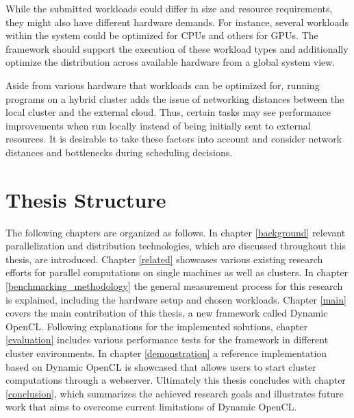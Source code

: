 \begin{description}[style=nextline]
    \item [Workload Diversity]
    While the submitted workloads could differ in size and resource requirements, they might also have different hardware demands. For instance, several workloads within the system could be optimized for CPUs and others for GPUs. The framework should support the execution of these workload types and additionally optimize the distribution across available hardware from a global system view.

    \item [Optimized Scheduling]
    Aside from various hardware that workloads can be optimized for, running programs on a hybrid cluster adds the issue of networking distances between the local cluster and the external cloud. Thus, certain tasks may see performance improvements when run locally instead of being initially sent to external resources. It is desirable to take these factors into account and consider network distances and bottlenecks during scheduling decisions.

\end{description}


\section*{Thesis Structure}
\label{structure}

The following chapters are organized as follows. In chapter \ref{background} relevant parallelization and distribution technologies, which are discussed throughout this thesis, are introduced. Chapter \ref{related} showcases various existing research efforts for parallel computations on single machines as well as clusters. In chapter \ref{benchmarking_methodology} the general measurement process for this research is explained, including the hardware setup and chosen workloads. Chapter \ref{main} covers the main contribution of this thesis, a new framework called Dynamic OpenCL. Following explanations for the implemented solutions, chapter \ref{evaluation} includes various performance tests for the framework in different cluster environments. In chapter \ref{demonstration} a reference implementation based on Dynamic OpenCL is showcased that allows users to start cluster computations through a webserver. Ultimately this thesis concludes with chapter \ref{conclusion}, which summarizes the achieved research goals and illustrates future work that aims to overcome current limitations of Dynamic OpenCL.
